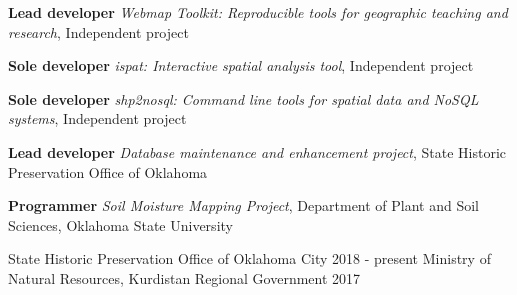 


\begin{softwareproject}
  \software
  {\textbf{Lead developer}}
  {\textit{Webmap Toolkit: Reproducible tools for geographic teaching and research}, Independent project}
  {\href{https://gitlab.com/mhaffner/webmap-toolkit}{\color{awesome}{https://gitlab.com/mhaffner/webmap-toolkit}}}

  \software
  {\textbf{Sole developer}}
  {\textit{ispat: Interactive spatial analysis tool}, Independent project}
  {\href{https://geohaff.com/ispat}{\color{awesome}{https://geohaff.com/ispat}}}

  \software
  {\textbf{Sole developer}}
  {\textit{shp2nosql: Command line tools for spatial data and
      NoSQL systems}, Independent project}
  {\href{https://github.com/mhaffner/shp2nosql}{\color{awesome}{https://github.com/mhaffner/shp2nosql}}}

  \software
  {\textbf{Lead developer}}
  {\textit{Database maintenance and enhancement project}, State
    Historic Preservation Office of Oklahoma}
  {\href{http://nr2_shpo.okstate.edu}{\color{awesome}{http://nr2\_shpo.okstate.edu}}}

  \software
  {\textbf{Programmer}}
  {\textit{Soil Moisture Mapping Project}, Department of Plant and Soil
    Sciences, Oklahoma State University}
  {\href{http://soilmoisture.okstate.edu}{\color{awesome}{http://soilmoisture.okstate.edu}}}

\end{softwareproject}


\begin{cvmemberships}
  \cvmembership
    {\hspace{-3 em}}
    {State Historic Preservation Office of Oklahoma City}
    {2018 - present}
    {} %
  \cvmembership
    {\hspace{-3 em}}
    {Ministry of Natural Resources, Kurdistan Regional Government}
    {\hspace{-2 em} 2017}
    {} %
\end{cvmemberships}